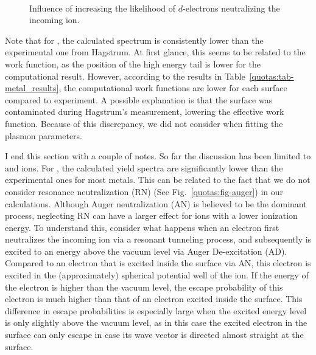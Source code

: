 \begin{refsection}
\begin{figure}[ht] 
    \centering 
    \captionsetup{width=0.9\textwidth}
    \begin{subfigure}[t]{0.49\textwidth} 
        \centering 
         
    \end{subfigure}%
    ~  
    \begin{subfigure}[t]{0.49\textwidth} 
        \centering 
         
    \end{subfigure} 
    \caption{\label{quotas:fig-d_influence} Influence of increasing the 
likelihood of $d$-electrons neutralizing the incoming ion.} 
\end{figure} 

Note that for , the calculated spectrum is consistently lower than the 
experimental one from Hagstrum. At first glance, this seems to be related to 
the work function, as the position of the high energy tail is lower for the 
computational result. However, according to the results in 
Table~\ref{quotas:tab-metal_results}, the computational work functions are 
lower for each surface compared to experiment. A possible explanation is that 
the  surface was contaminated during Hagstrum's measurement, lowering 
the effective work function. Because of this discrepancy, we did not consider 
 when fitting the plasmon parameters. 

I end this section with a couple of notes. So far the discussion has been limited 
to  and  ions. For , the calculated yield spectra 
are significantly lower than the experimental ones for most metals. This 
can be related to the fact that we do not consider resonance neutralization (\gls{RN})
(See Fig.~\ref{quotas:fig-auger}) in our calculations. Although Auger 
neutralization (\gls{AN}) is believed to be the dominant process, neglecting \gls{RN} 
can have a larger effect for ions with a lower ionization energy. 
To understand this, consider what happens when an electron first neutralizes
the incoming ion via a resonant tunneling process, and subsequently is excited
to an energy above the vacuum level via Auger De-excitation (\gls{AD}). Compared 
to an electron that is excited inside the surface via \gls{AN}, this electron is excited in 
the (approximately) spherical potential well of the ion. If the energy of the 
electron is higher than the vacuum level, the escape probability of this 
electron is much higher than that of an electron excited inside the surface. 
This difference in escape probabilities is especially large when the excited 
energy level is only slightly above the vacuum level, as in this case the 
excited electron in the surface can only escape in case its wave vector is 
directed almost straight at the surface.


\end{refsection}
